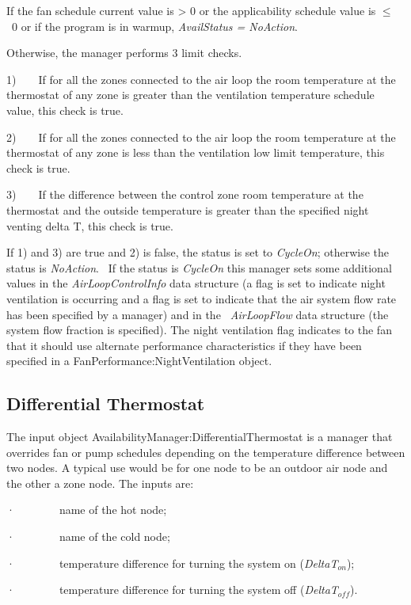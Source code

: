 If the fan schedule current value is \textgreater{} 0 or the applicability schedule value is \(\le\) ~0 or if the program is in warmup, \emph{AvailStatus = NoAction}.

Otherwise, the manager performs 3 limit checks.

1)~~~~If for all the zones connected to the air loop the room temperature at the thermostat of any zone is greater than the ventilation temperature schedule value, this check is true.

2)~~~~If for all the zones connected to the air loop the room temperature at the thermostat of any zone is less than the ventilation low limit temperature, this check is true.

3)~~~~If the difference between the control zone room temperature at the thermostat and the outside temperature is greater than the specified night venting delta T, this check is true.

If 1) and 3) are true and 2) is false, the status is set to \emph{CycleOn}; otherwise the status is \emph{NoAction}.~ If the status is \emph{CycleOn} this manager sets some additional values in the \emph{AirLoopControlInfo} data structure (a flag is set to indicate night ventilation is occurring and a flag is set to indicate that the air system flow rate has been specified by a manager) and in the \emph{~AirLoopFlow} data structure (the system flow fraction is specified). The night ventilation flag indicates to the fan that it should use alternate performance characteristics if they have been specified in a FanPerformance:NightVentilation object.

\subsection{Differential Thermostat}\label{differential-thermostat}

The input object AvailabilityManager:DifferentialThermostat is a manager that overrides fan or pump schedules depending on the temperature difference between two nodes. A typical use would be for one node to be an outdoor air node and the other a zone node. The inputs are:

·~~~~~~~~name of the hot node;

·~~~~~~~~name of the cold node;

·~~~~~~~~temperature difference for turning the system on (\emph{DeltaT\(_{on}\)});

·~~~~~~~~temperature difference for turning the system off (\emph{DeltaT\(_{off}\)}).

